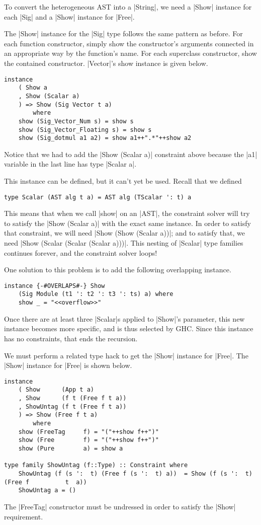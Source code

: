 \documentclass[preprint]{sigplanconf}
\theoremstyle{definition}
\begin{document}
To convert the heterogeneous AST into a |String|,
we need a |Show| instance for each |Sig| and a |Show| instance for |Free|.

The |Show| instance for the |Sig| type follows the same pattern as before.
For each function constructor,
simply show the constructor's arguments connected in an appropriate way by the function's name.
For each superclass constructor, show the contained constructor.
|Vector|'s show instance is given below.
\begin{lstlisting}
instance
    ( Show a
    , Show (Scalar a)
    ) => Show (Sig Vector t a)
        where
    show (Sig_Vector_Num s) = show s
    show (Sig_Vector_Floating s) = show s
    show (Sig_dotmul a1 a2) = show a1++".*"++show a2
\end{lstlisting}
Notice that we had to add the |Show (Scalar a)| constraint above because the |a1| variable in the last line has type |Scalar a|.

This instance can be defined, but it can't yet be used.
Recall that we defined
\begin{lstlisting}
type Scalar (AST alg t a) = AST alg (TScalar ': t) a
\end{lstlisting}
This means that when we call |show| on an |AST|,
the constraint solver will try to satisfy the |Show (Scalar a)| with the exact same instance.
In order to satisfy that constraint, we will need |Show (Show (Scalar a))|;
and to satisfy that, we need |Show (Scalar (Scalar (Scalar a)))|.
This nesting of |Scalar| type families continues forever,
and the constraint solver loops!

One solution to this problem is to add the following overlapping instance.
\begin{lstlisting}
instance {-#OVERLAPS#-} Show
    (Sig Module (t1 ': t2 ': t3 ': ts) a) where
    show _ = "<<overflow>>"
\end{lstlisting}
Once there are at least three |Scalar|s applied to |Show|'s parameter,
this new instance becomes more specific,
and is thus selected by GHC.
Since this instance has no constraints,
that ends the recursion.

We must perform a related type hack to get the |Show| instance for |Free|.
The |Show| instance for |Free| is shown below.
\begin{lstlisting}
instance
    ( Show      (App t a)
    , Show      (f t (Free f t a))
    , ShowUntag (f t (Free f t a))
    ) => Show (Free f t a)
        where
    show (FreeTag     f) = "("++show f++")"
    show (Free        f) = "("++show f++")"
    show (Pure        a) = show a

type family ShowUntag (f::Type) :: Constraint where
    ShowUntag (f (s ':  t) (Free f (s ':  t) a))  = Show (f (s ':  t) (Free f          t  a))
    ShowUntag a = ()
\end{lstlisting}
The |FreeTag| constructor must be undressed in order to satisfy the |Show| requirement.
\end{document}

